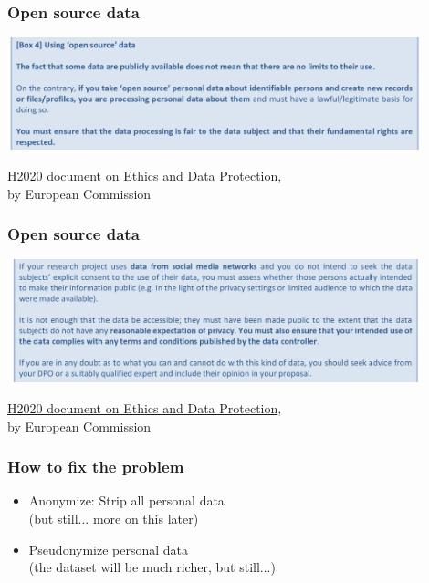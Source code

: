 \documentclass[17pt,aspectratio=169,hyperref={pdfusetitle,colorlinks,allcolors=olive}]{beamer}
\begin{document}
\begin{frame}[fragile]
  \frametitle{Open source data}

  \begin{center}
  \includegraphics[width=12cm]{figs/gdpr-open-source-data}
  \end{center}  
  
  {\footnotesize
    \begin{flushright}
    \href{https://ec.europa.eu/research/participants/data/ref/h2020/grants_manual/hi/ethics/h2020_hi_ethics-data-protection_en.pdf}{H2020 document on Ethics and Data Protection}, \\ by European Commission
  \end{flushright}
  }
\end{frame}

\begin{frame}[fragile]
  \frametitle{Open source data}

  \begin{center}
  \includegraphics[width=12cm]{figs/gdpr-open-source-data-b}
  \end{center}  

  {\footnotesize
    \begin{flushright}
    \href{https://ec.europa.eu/research/participants/data/ref/h2020/grants_manual/hi/ethics/h2020_hi_ethics-data-protection_en.pdf}{H2020 document on Ethics and Data Protection}, \\ by European Commission
  \end{flushright}
  }
\end{frame}

\begin{frame}[fragile]
  \frametitle{How to fix the problem}
  
  \begin{itemize}
  \item Anonymize: Strip all personal data \\
    (but still... more on this later)
  \item Pseudonymize personal data \\
    (the dataset will be much richer, but still...)
  \end{itemize}
\end{frame}
\end{document}
